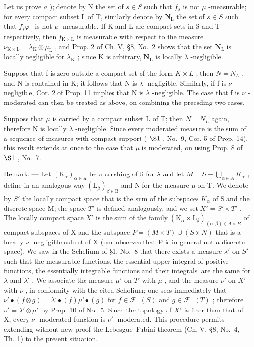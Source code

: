 Let us prove \(a\) ); denote by N the set of \(s \in S\) such that \(f_s\) is not \(\mu\) -measurable; for every compact subset L of T, similarly denote by \(\mathbf{N}_{\mathrm{L}}\) the set of \(s \in S\) such that \(f_s \varphi_{\mathrm{L}}\) is not \(\mu\) -measurable. If K and L are compact sets in S and T respectively, then \(f_{\mathrm{K} \times \mathrm{L}}\) is measurable with respect to the measure \(\nu_{\mathrm{K} \times \mathrm{L}} = \lambda_{\mathrm{K}} \otimes \mu_{\mathrm{L}}\) , and Prop. 2 of Ch. V, §8, No.~2 shows that the set \(\mathbf{N}_{\mathrm{L}}\) is locally negligible for \(\lambda_{\mathrm{K}}\) ; since K is arbitrary, \(\mathbf{N}_{\mathrm{L}}\) is locally \(\lambda\) -negligible.

Suppose that f is zero outside a compact set of the form \(K \times L\) ; then \(N = N_{L}\) , and N is contained in K; it follows that N is \(\lambda\) -negligible. Similarly, if f is \(\nu\) -negligible, Cor. 2 of Prop. 11 implies that N is \(\lambda\) -negligible. The case that f is \(\nu\) -moderated can then be treated as above, on combining the preceding two cases.

Suppose that \(\mu\) is carried by a compact subset L of T; then \(N = N_{L}\) again, therefore N is locally \(\lambda\) -negligible. Since every moderated measure is the sum of a sequence of measures with compact support ( \(\S1\) , No.~9, Cor. 5 of Prop. 14), this result extends at once to the case that \(\mu\) is moderated, on using Prop. 8 of \(\S1\) , No.~7.

Remark. --- Let \((\mathrm{K}_{\alpha})_{\alpha\in\mathrm{A}}\) be a crushing of S for \(\lambda\) and let \(M = S - \bigcup_{\alpha\in A} K_{\alpha}\) ; define in an analogous way \((\mathrm{L}_{\beta})_{\beta\in\mathrm{B}}\) and N for the measure \(\mu\) on T. We denote by \(S'\) the locally compact space that is the sum of the subspaces \(K_{\alpha}\) of S and the discrete space M; the space \(T'\) is defined analogously, and we set \(X' = S' \times T'\) . The locally compact space \(X'\) is the sum of the family \((\mathrm{K}_{\alpha} \times \mathrm{L}_{\beta})_{(\alpha,\beta)\in A\times B}\) of compact subspaces of X and the subspace \(P = (M \times T) \cup (S \times N)\) that is a locally \(\nu\) -negligible subset of X (one observes that P is in general not a discrete space). We saw in the Scholium of §1, No.~8 that there exists a measure \(\lambda'\) on \(S'\) such that the measurable functions, the essential upper integral of positive functions, the essentially integrable functions and their integrals, are the same for \(\lambda\) and \(\lambda'\) . We associate the measure \(\mu'\) on \(T'\) with \(\mu\) , and the measure \(\nu'\) on \(X'\) with \(\nu\) , in conformity with the cited Scholium; one sees immediately that \(\nu'\bullet(f \otimes g) = \lambda'\bullet(f)\mu'\bullet(g)\) for \(f \in \mathcal{F}_{+}(S)\) and \(g \in \mathcal{F}_{+}(T)\) ; therefore \(\nu' = \lambda' \otimes \mu'\) by Prop. 10 of No.~5. Since the topology of \(X'\) is finer than that of X, every \(\nu\) -moderated function is \(\nu'\) -moderated. This procedure permits extending without new proof the Lebesgue--Fubini theorem (Ch. V, §8, No.~4, Th. 1) to the present situation.

